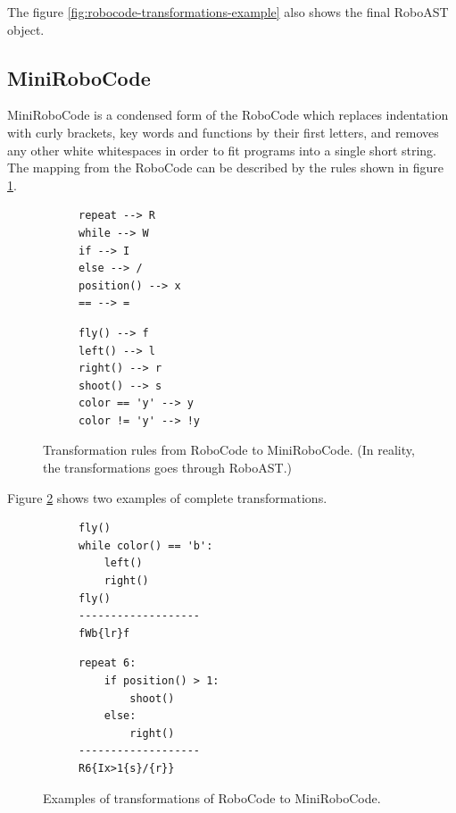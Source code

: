 The figure \ref{fig:robocode-transformations-example} also shows the final RoboAST object.

\subsection{MiniRoboCode}

MiniRoboCode is a condensed form of the RoboCode
which replaces indentation with curly brackets,
key words and functions by their first letters,
and removes any other white whitespaces
in order to fit programs into a single short string.
The mapping from the RoboCode can be described by the rules
shown in figure \ref{fig:minirobocode-transformation-rules}.

\begin{figure}[h]
\begin{subfigure}{.49\textwidth}
{\lstset{numbers=none}
\begin{lstlisting}
repeat --> R
while --> W
if --> I
else --> /
position() --> x
== --> =
\end{lstlisting}}
\end{subfigure}
\begin{subfigure}{.49\textwidth}
{\lstset{numbers=none}
\begin{lstlisting}
fly() --> f
left() --> l
right() --> r
shoot() --> s
color == 'y' --> y
color != 'y' --> !y
\end{lstlisting}}
\end{subfigure}
\caption{Transformation rules from RoboCode to MiniRoboCode. (In reality, the transformations goes through RoboAST.)}
\label{fig:minirobocode-transformation-rules}
\end{figure}

Figure \ref{fig:minirobocode-transformations} shows
two examples of complete transformations.
\begin{figure}[h]
\begin{subfigure}{.49\textwidth}
{\lstset{numbers=none}
\begin{lstlisting}
fly()
while color() == 'b':
    left()
    right()
fly()
-------------------
fWb{lr}f
\end{lstlisting}}
\end{subfigure}
\begin{subfigure}{.49\textwidth}
{\lstset{numbers=none}
\begin{lstlisting}
repeat 6:
    if position() > 1:
        shoot()
    else:
        right()
-------------------
R6{Ix>1{s}/{r}}
\end{lstlisting}}
\end{subfigure}
\caption{Examples of transformations of RoboCode to MiniRoboCode.}
\label{fig:minirobocode-transformations}
\end{figure}

